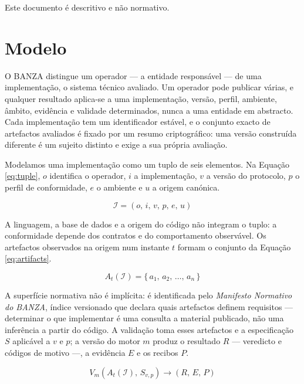 \documentclass[journal abbreviation, manuscript]{copernicus}
\begin{document}
Este documento é descritivo e não normativo.


\section{Modelo}\label{sec:model}

O BANZA distingue um operador --- a entidade responsável --- de uma implementação, o sistema técnico avaliado. Um operador pode publicar várias, e qualquer resultado aplica-se a uma implementação, versão, perfil, ambiente, âmbito, evidência e validade determinados, nunca a uma entidade em abstracto. Cada implementação tem um identificador estável, e o conjunto exacto de artefactos avaliados é fixado por um resumo criptográfico: uma versão construída diferente é um sujeito distinto e exige a sua própria avaliação.

Modelamos uma implementação como um tuplo de seis elementos. Na Equação \eqref{eq:tuple}, \(o\) identifica o operador, \(i\) a implementação, \(v\) a versão do protocolo, \(p\) o perfil de conformidade, \(e\) o ambiente e \(u\) a origem canónica.

\begin{equation}
\mathcal{I} = (o,\, i,\, v,\, p,\, e,\, u)
\tag{2}\label{eq:tuple}
\end{equation}

A linguagem, a base de dados e a origem do código não integram o tuplo: a conformidade depende dos contratos e do comportamento observável. Os artefactos observados na origem num instante \(t\) formam o conjunto da Equação \eqref{eq:artifacts}.

\begin{equation}
A_t(\mathcal{I}) = \{\, a_1,\, a_2,\, \dots,\, a_n \,\}
\tag{3}\label{eq:artifacts}
\end{equation}

A superfície normativa não é implícita: é identificada pelo \emph{Manifesto Normativo do BANZA}, índice versionado que declara quais artefactos definem requisitos --- determinar o que implementar é uma consulta a material publicado, não uma inferência a partir do código. A validação toma esses artefactos e a especificação \(S\) aplicável a \(v\) e \(p\); a versão do motor \(m\) produz o resultado \(R\) --- veredicto e códigos de motivo ---, a evidência \(E\) e os recibos \(P\).

\begin{equation}
V_m\!\left(A_t(\mathcal{I}),\, S_{v,p}\right) \rightarrow (R,\, E,\, P)
\tag{4}\label{eq:validation}
\end{equation}
\end{document}
